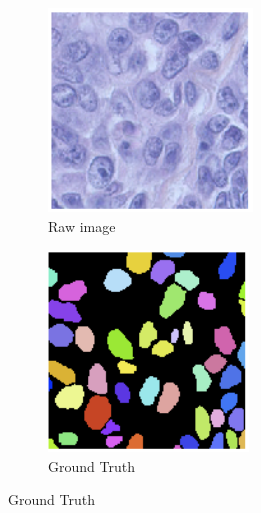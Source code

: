 \documentclass[a4paper,10pt,twocolumn]{article}
\begin{document}
\begin{figure}
    \centering
\begin{subfigure}[t]{0.45\textwidth}
        \centering
        \hspace{0.5cm}
        \includegraphics[width=0.6\linewidth]{RAW} 
        \caption{Raw image} \label{fig:raw}
    \end{subfigure}%
    \begin{subfigure}[t]{0.45\textwidth}
        \centering
        \includegraphics[width=0.6\linewidth]{LBL} 
        \caption{Ground Truth} \label{fig:lbl}
    \end{subfigure}


\end{figure}
\end{document}
